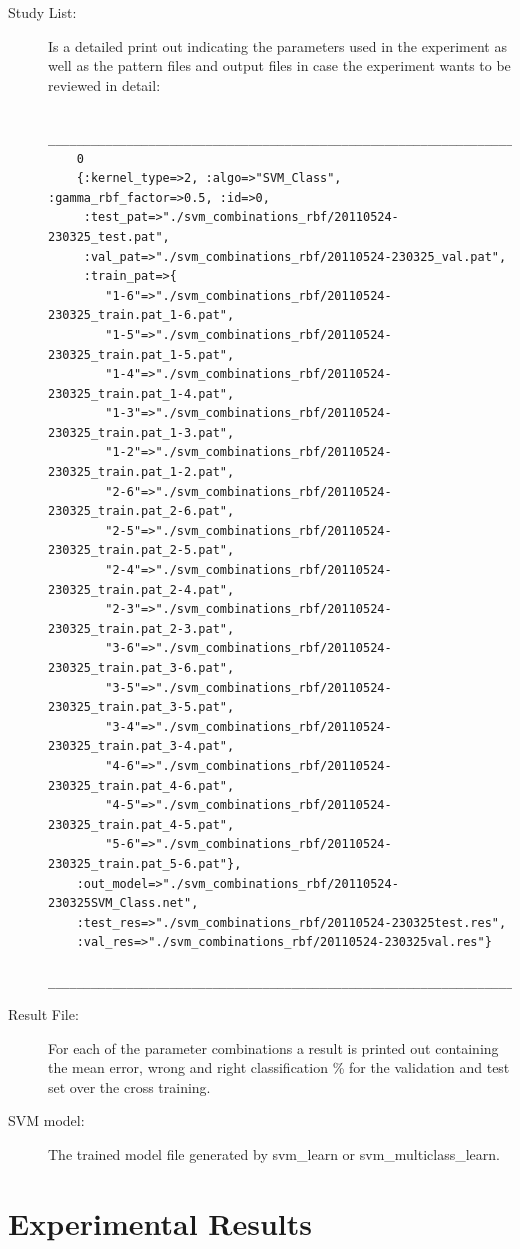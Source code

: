 \documentclass[a4paper,10pt,titlepage]{article}
\begin{document}
\begin{description}
	\item[Study List:] Is a detailed print out indicating the parameters used in the experiment as well as the pattern files and output files in case the experiment wants to be reviewed in detail:
	{\footnotesize\begin{verbatim}
	______________________________________________________________________________________
	0
	{:kernel_type=>2, :algo=>"SVM_Class", :gamma_rbf_factor=>0.5, :id=>0,
	 :test_pat=>"./svm_combinations_rbf/20110524-230325_test.pat", 
	 :val_pat=>"./svm_combinations_rbf/20110524-230325_val.pat", 
	 :train_pat=>{
		"1-6"=>"./svm_combinations_rbf/20110524-230325_train.pat_1-6.pat", 
		"1-5"=>"./svm_combinations_rbf/20110524-230325_train.pat_1-5.pat", 
		"1-4"=>"./svm_combinations_rbf/20110524-230325_train.pat_1-4.pat", 
		"1-3"=>"./svm_combinations_rbf/20110524-230325_train.pat_1-3.pat", 
		"1-2"=>"./svm_combinations_rbf/20110524-230325_train.pat_1-2.pat", 
		"2-6"=>"./svm_combinations_rbf/20110524-230325_train.pat_2-6.pat", 
		"2-5"=>"./svm_combinations_rbf/20110524-230325_train.pat_2-5.pat", 
		"2-4"=>"./svm_combinations_rbf/20110524-230325_train.pat_2-4.pat", 
		"2-3"=>"./svm_combinations_rbf/20110524-230325_train.pat_2-3.pat", 
		"3-6"=>"./svm_combinations_rbf/20110524-230325_train.pat_3-6.pat", 
		"3-5"=>"./svm_combinations_rbf/20110524-230325_train.pat_3-5.pat", 
		"3-4"=>"./svm_combinations_rbf/20110524-230325_train.pat_3-4.pat", 
		"4-6"=>"./svm_combinations_rbf/20110524-230325_train.pat_4-6.pat", 
		"4-5"=>"./svm_combinations_rbf/20110524-230325_train.pat_4-5.pat", 
		"5-6"=>"./svm_combinations_rbf/20110524-230325_train.pat_5-6.pat"}, 
	:out_model=>"./svm_combinations_rbf/20110524-230325SVM_Class.net",
	:test_res=>"./svm_combinations_rbf/20110524-230325test.res",
	:val_res=>"./svm_combinations_rbf/20110524-230325val.res"}
	______________________________________________________________________________________
	\end{verbatim}}
	
	\item[Result File:] For each of the parameter combinations a result is printed out containing the mean error, wrong and right classification \% for the validation and test set over the cross training.
	\item[SVM model:] The trained model file generated by svm\_learn or svm\_multiclass\_learn. 
\end{description}


\section{Experimental Results}
\end{document}
